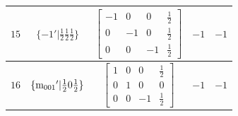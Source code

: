 \documentclass[fleqn,8pt]{jsarticle}
\begin{document}
\begin{longtable}{ccccc}
$ 15 $ & $ \{-1{}'|\frac{1}{2} \frac{1}{2} \frac{1}{2}\} $ & $ \begin{bmatrix} -1 & 0 & 0 & \frac{1}{2} \\ 0 & -1 & 0 & \frac{1}{2} \\ 0 & 0 & -1 & \frac{1}{2} \end{bmatrix} $ & $ -1 $ & $ -1 $ \\ \hline
$ 16 $ & $ \{{\rm m}_{001}{}'|\frac{1}{2} 0 \frac{1}{2}\} $ & $ \begin{bmatrix} 1 & 0 & 0 & \frac{1}{2} \\ 0 & 1 & 0 & 0 \\ 0 & 0 & -1 & \frac{1}{2} \end{bmatrix} $ & $ -1 $ & $ -1 $ \\
\end{longtable}
\end{document}
